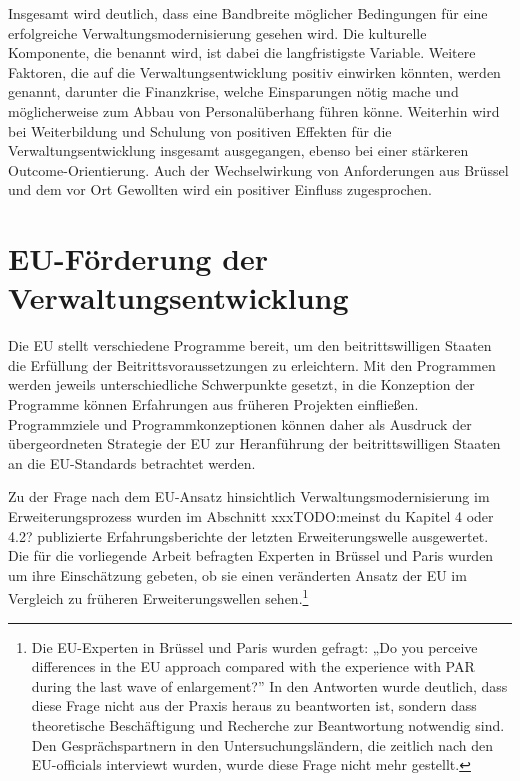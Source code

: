 Insgesamt wird deutlich, dass eine Bandbreite möglicher Bedingungen für eine erfolgreiche Verwaltungsmodernisierung gesehen wird. Die kulturelle Komponente, die benannt wird, ist dabei die langfristigste Variable. Weitere Faktoren, die auf die Verwaltungsentwicklung positiv einwirken könnten, werden genannt, darunter die Finanzkrise, welche Einsparungen nötig mache und möglicherweise zum Abbau von Personalüberhang führen könne. Weiterhin wird bei Weiterbildung und Schulung von positiven Effekten für die Verwaltungsentwicklung insgesamt ausgegangen, ebenso bei einer stärkeren Outcome-Orientierung. Auch der Wechselwirkung von Anforderungen aus Brüssel und dem vor Ort Gewollten wird ein positiver Einfluss zugesprochen.


\section{EU-Förderung der Verwaltungsentwicklung }
Die EU stellt verschiedene Programme bereit, um den beitrittswilligen Staaten die Erfüllung der Beitrittsvoraussetzungen zu erleichtern. Mit den Programmen werden jeweils unterschiedliche Schwerpunkte gesetzt, in die Konzeption der Programme können Erfahrungen aus früheren Projekten einfließen. Programmziele und Programmkonzeptionen können daher als Ausdruck der übergeordneten Strategie der EU zur Heranführung der beitrittswilligen Staaten an die EU-Standards betrachtet werden.\par
Zu der Frage nach dem EU-Ansatz hinsichtlich Verwaltungsmodernisierung im Erweiterungsprozess wurden im Abschnitt xxx{TODO:meinst du Kapitel 4 oder 4.2?} publizierte Erfahrungsberichte der letzten Erweiterungswelle ausgewertet. Die für die vorliegende Arbeit befragten Experten in Brüssel und Paris wurden um ihre Einschätzung gebeten, ob sie einen veränderten Ansatz der EU im Vergleich zu früheren Erweiterungswellen sehen.\footnote{Die EU-Experten in Brüssel und Paris wurden gefragt: „Do you perceive differences in the EU approach compared with the experience with PAR during the last wave of enlargement?” In den Antworten wurde deutlich, dass diese Frage nicht aus der Praxis heraus zu beantworten ist, sondern dass theoretische Beschäftigung und Recherche zur Beantwortung notwendig sind. Den Gesprächspartnern in den Untersuchungsländern, die zeitlich nach den EU-officials interviewt wurden, wurde diese Frage nicht mehr gestellt.}

